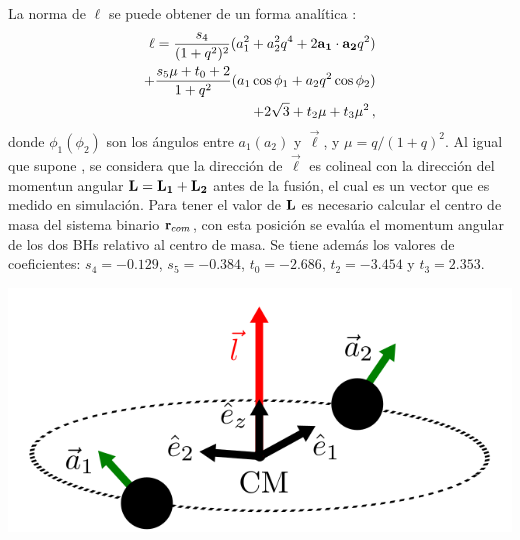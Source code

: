 La norma de $\ell$ se puede obtener de un forma analítica \cite{rezzolla2008}: 
%
\begin{align}
    \ell = \frac{s_{4}}{(1+q^{2})^{2}}(a_{1}^{2}+a_{2}^{2}q^{4}+2{\bf{a_{1}\cdot a_{2}}}q^{2})\\ + \frac{s_{5}\mu + t_{0}+2}{1+q^{2}}(a_{1}\cos\phi_{1}+a_{2}q^{2}\cos\phi_{2})\\ 
    + 2\sqrt{3}+t_{2}\mu+t_{3}\mu^{2}\,,
\end{align}
donde $\phi_{1}(\phi_{2})$ son los ángulos entre $a_{1}(a_{2})$ y $\vec{\ell}$, y $\mu = q/(1+q)^{2}$. Al igual que supone \cite{rezzolla2008}, se considera que la dirección de $\Vec{\ell}$ es colineal con la dirección del momentun angular ${\bf{L=L_{1}+L_{2}}}$ antes de la fusión, el cual es un vector que es medido en simulación. Para tener el valor de ${\bf{L}}$ es necesario calcular el centro de masa del sistema binario ${\bf{r}}_{com}$, con esta posición se evalúa el momentum angular de los dos BHs relativo al centro de masa. Se tiene además los valores de coeficientes: $s_{4}=-0.129$, $s_{5}=-0.384$, $t_{0}=-2.686$, $t_{2}=-3.454$ y $t_{3}=2.353$.

\begin{center}
\includegraphics[scale=.3]{./figures/4_Modelo_Spin/fusion_BHs.png}
\label{fig: fusion_Bhs}
\end{center}















